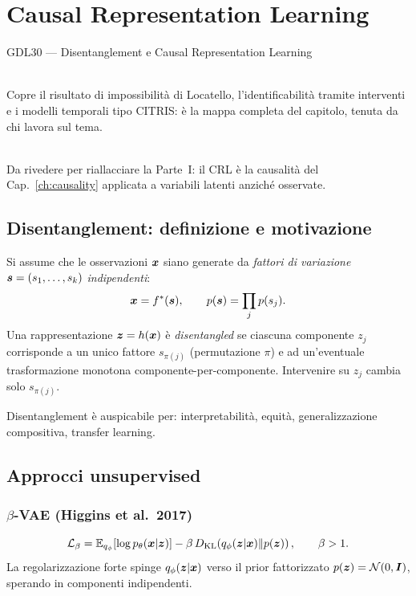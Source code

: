 \chapter{Causal Representation Learning}
\label{ch:crl}

\begin{risorsevideo}{GDL30 — Disentanglement e Causal Representation Learning}

\medskip
{}\\
Copre il risultato di impossibilità di Locatello, l'identificabilità tramite interventi e i modelli temporali tipo CITRIS: è la mappa completa del capitolo, tenuta da chi lavora sul tema.

\medskip
{}\\
Da rivedere per riallacciare la Parte~I: il CRL è la causalità del Cap.~\ref{ch:causality} applicata a variabili latenti anziché osservate.
\end{risorsevideo}

\section{Disentanglement: definizione e motivazione}

Si assume che le osservazioni $\bm{x}$ siano generate da \emph{fattori di variazione} $\bm{s} = (s_1, \dots, s_k)$ \emph{indipendenti}:
\[
\bm{x} = f^*(\bm{s}), \qquad p(\bm{s}) = \prod_j p(s_j).
\]
Una rappresentazione $\bm{z} = h(\bm{x})$ è \emph{disentangled} se ciascuna componente $z_j$ corrisponde a un unico fattore $s_{\pi(j)}$ (permutazione $\pi$) e ad un'eventuale trasformazione monotona componente-per-componente. Intervenire su $z_j$ cambia solo $s_{\pi(j)}$.

Disentanglement è auspicabile per: interpretabilità, equità, generalizzazione compositiva, transfer learning.

\section{Approcci unsupervised}

\subsection{$\beta$-VAE (Higgins et al.\ 2017)}
\[
\mathcal{L}_\beta = \mathbb{E}_{q_\phi}[\log p_\theta(\bm{x}|\bm{z})] - \beta\,D_{\mathrm{KL}}\!\left(q_\phi(\bm{z}|\bm{x}) \| p(\bm{z})\right),\qquad \beta > 1.
\]
La regolarizzazione forte spinge $q_\phi(\bm{z}|\bm{x})$ verso il prior fattorizzato $p(\bm{z}) = \mathcal{N}(0,\bm{I})$, sperando in componenti indipendenti.

